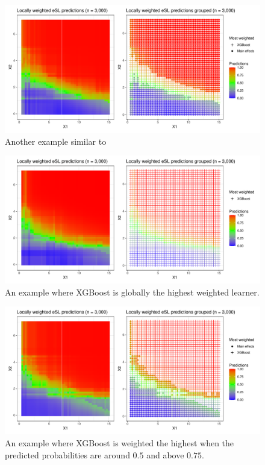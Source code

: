 \documentclass[11pt, a4paper]{article}
\theoremstyle{definition}
\theoremstyle{remark}
\begin{document}
\begin{figure}[H]
    \centering
    \centerline{\includegraphics[width=1.2\textwidth]{figures/esl_preds_lw_stratified_tiled5.pdf}}
    \caption{Another example similar to }
    \label{fig:esl_preds_lw_stratified_tiled5}
\end{figure}
\begin{figure}[H]
    \centering
    \centerline{\includegraphics[width=1.2\textwidth]{figures/esl_preds_lw_stratified_tiled3.pdf}}
    \caption{An example where XGBoost is globally the highest weighted learner.}
    \label{fig:esl_preds_lw_stratified_tiled3}
\end{figure}

\begin{figure}[H]
    \centering
    \centerline{\includegraphics[width=1.2\textwidth]{figures/esl_preds_lw_stratified_tiled4.pdf}}
    \caption{An example where XGBoost is weighted the highest when the predicted probabilities are around $ 0.5 $ and above $ 0.75$.}
    \label{fig:esl_preds_lw_stratified_tiled4}
\end{figure}

\newpage
\printbibliography
\end{document}
